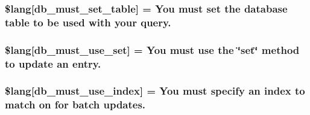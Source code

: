 \subsubsection[{\$lang}]{\setlength{\rightskip}{0pt plus 5cm}\$lang\mbox{[}\textquotesingle{}db\+\_\+must\+\_\+set\+\_\+table\textquotesingle{}\mbox{]} = \textquotesingle{}You must set the database table to be used with your query.\textquotesingle{}}\label{_admin_2system_2language_2english_2db__lang_8php_a0f5d469f071f2b5327b44761f4a06396}
\hypertarget{_admin_2system_2language_2english_2db__lang_8php_a55e22fb14cedc8ee7f70980bf7f37308}{}
\subsubsection[{\$lang}]{\setlength{\rightskip}{0pt plus 5cm}\$lang\mbox{[}\textquotesingle{}db\+\_\+must\+\_\+use\+\_\+set\textquotesingle{}\mbox{]} = \textquotesingle{}You must use the \char`\"{}set\char`\"{} method to update an entry.\textquotesingle{}}\label{_admin_2system_2language_2english_2db__lang_8php_a55e22fb14cedc8ee7f70980bf7f37308}
\hypertarget{_admin_2system_2language_2english_2db__lang_8php_a708419b6b94728c30474ee5fdde3b99b}{}
\subsubsection[{\$lang}]{\setlength{\rightskip}{0pt plus 5cm}\$lang\mbox{[}\textquotesingle{}db\+\_\+must\+\_\+use\+\_\+index\textquotesingle{}\mbox{]} = \textquotesingle{}You must specify an index to match {\bf on} {\bf for} batch updates.\textquotesingle{}}\label{_admin_2system_2language_2english_2db__lang_8php_a708419b6b94728c30474ee5fdde3b99b}
\hypertarget{_admin_2system_2language_2english_2db__lang_8php_af946769a3dd5679c60e6f2ef5f7a5aa1}{}
